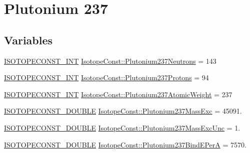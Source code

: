 \hypertarget{group___isotope_const-_plutonium-_pu237}{}\section{Plutonium 237}
\label{group___isotope_const-_plutonium-_pu237}
\subsection*{Variables}
\begin{DoxyCompactItemize}
\item 
\mbox{\hyperlink{group___isotope_const-_macros_ga5f18360b3e99483a35c32d789e62621c}{I\+S\+O\+T\+O\+P\+E\+C\+O\+N\+S\+T\+\_\+\+I\+NT}} \mbox{\hyperlink{group___isotope_const-_plutonium-_pu237_ga93d7e9c55e3b9fa2820f7da68dcfc2aa}{Isotope\+Const\+::\+Plutonium237\+Neutrons}} = 143
\item 
\mbox{\hyperlink{group___isotope_const-_macros_ga5f18360b3e99483a35c32d789e62621c}{I\+S\+O\+T\+O\+P\+E\+C\+O\+N\+S\+T\+\_\+\+I\+NT}} \mbox{\hyperlink{group___isotope_const-_plutonium-_pu237_ga2e3d3f7bd41fef1dd6ec97c8e41af977}{Isotope\+Const\+::\+Plutonium237\+Protons}} = 94
\item 
\mbox{\hyperlink{group___isotope_const-_macros_ga5f18360b3e99483a35c32d789e62621c}{I\+S\+O\+T\+O\+P\+E\+C\+O\+N\+S\+T\+\_\+\+I\+NT}} \mbox{\hyperlink{group___isotope_const-_plutonium-_pu237_ga6b2ebc4e7dd69fe04d68a7d0a8acda20}{Isotope\+Const\+::\+Plutonium237\+Atomic\+Weight}} = 237
\item 
\mbox{\hyperlink{group___isotope_const-_macros_ga8f45a7272ce02c0b4c65c44636ed719a}{I\+S\+O\+T\+O\+P\+E\+C\+O\+N\+S\+T\+\_\+\+D\+O\+U\+B\+LE}} \mbox{\hyperlink{group___isotope_const-_plutonium-_pu237_ga71e4f5d9c0d791292b66bf9b427d0799}{Isotope\+Const\+::\+Plutonium237\+Mass\+Exc}} = 45091.
\item 
\mbox{\hyperlink{group___isotope_const-_macros_ga8f45a7272ce02c0b4c65c44636ed719a}{I\+S\+O\+T\+O\+P\+E\+C\+O\+N\+S\+T\+\_\+\+D\+O\+U\+B\+LE}} \mbox{\hyperlink{group___isotope_const-_plutonium-_pu237_ga04c3991fc3e9d971666039c7de6b7b43}{Isotope\+Const\+::\+Plutonium237\+Mass\+Exc\+Unc}} = 1.
\item 
\mbox{\hyperlink{group___isotope_const-_macros_ga8f45a7272ce02c0b4c65c44636ed719a}{I\+S\+O\+T\+O\+P\+E\+C\+O\+N\+S\+T\+\_\+\+D\+O\+U\+B\+LE}} \mbox{\hyperlink{group___isotope_const-_plutonium-_pu237_gab03deac0574a0ede04e18508b593be49}{Isotope\+Const\+::\+Plutonium237\+Bind\+E\+PerA}} = 7570.
\item 

\end{DoxyCompactItemize}
